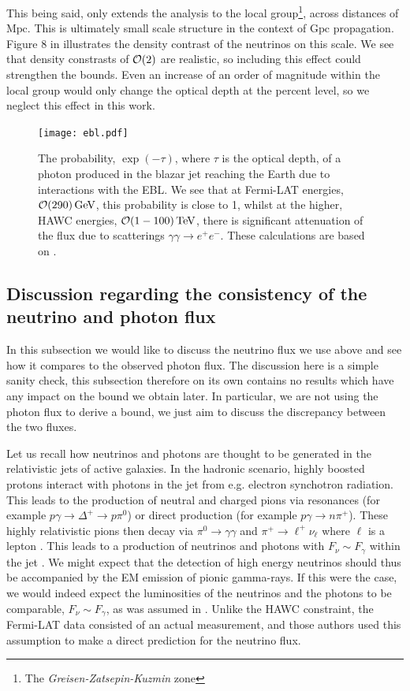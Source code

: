 This being said, \cite{Ringwald2004} only extends the analysis to the local group\footnote{The \textit{Greisen-Zatsepin-Kuzmin} zone}, across distances of $\textrm{Mpc}$. This is ultimately small scale structure in the context of $\textrm{Gpc}$ propagation. Figure 8 in \cite{Ringwald2004} illustrates the density contrast of the neutrinos on this scale. We see that density constrasts of $\mathcal{O}(2)$ are realistic, so including this effect could strengthen the bounds. Even an increase of an order of magnitude within the local group would only change the optical depth at the percent level, so we neglect this effect in this work.

\begin{figure}[t]
 \centering
 \texttt{[image: ebl.pdf]}
 \caption{The probability, $\exp(-\tau)$, where $\tau$ is the optical depth, of a photon produced in the blazar jet reaching the Earth due to interactions with the EBL. We see that at Fermi-LAT energies, $\mathcal{O}(290) \, \mathrm{GeV}$, this probability is close to 1, whilst at the higher, HAWC energies, $\mathcal{O}(1 - 100) \, \mathrm{TeV}$, there is significant attenuation of the flux due to scatterings $\gamma\gamma \rightarrow e^{+}e^{-}$. These calculations are based on \cite{DeLavallaz:2011ju}.}
 \label{fig:ebl}
\end{figure}

\subsection{Discussion regarding the consistency of the neutrino and photon flux}\label{sec:consistent}

In this subsection we would like to discuss the neutrino flux we use above and see how it compares to the observed photon flux.  The discussion here is a simple sanity check, this subsection therefore on its own contains no results which have any impact on the bound we obtain later. In particular, we are not using the photon flux to derive a bound, we just aim to discuss the discrepancy between the two fluxes.

Let us recall how neutrinos and photons are thought to be generated in the relativistic jets of active galaxies. In the hadronic scenario, highly boosted protons interact with photons in the jet from e.g. electron synchotron radiation. This leads to the production of neutral and charged pions via resonances (for example $p\gamma \rightarrow \Delta^+ \rightarrow p\pi^0$) or direct production (for example $p\gamma \rightarrow n\pi^+$). These highly relativistic pions then decay via $\pi^0 \rightarrow \gamma \gamma$ and $\pi^+ \rightarrow \ell^+ \nu_\ell$ where $\ell$ is a lepton \cite{Mucke:1998mk, Szabo:1994qx}. This leads to a production of neutrinos and photons with $F_\nu \sim F_\gamma$ within the jet \cite{Keivani2018}. We might expect that the detection of high energy neutrinos should thus be accompanied by the EM emission of pionic gamma-rays. If this were the case, we would indeed expect the luminosities of the neutrinos and the photons to be comparable, $F_\nu \sim F_\gamma$, as was assumed in \cite{Kelly}.  Unlike the HAWC constraint, the Fermi-LAT data consisted of an actual measurement, and those authors used this assumption to make a direct prediction for the neutrino flux.

